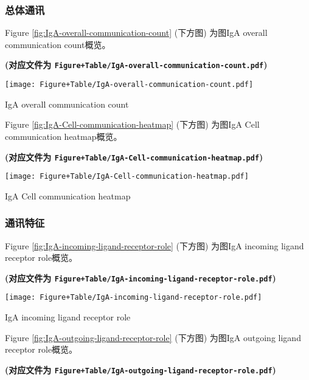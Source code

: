 \documentclass[
]{article}
\begin{document}
\hypertarget{ux603bux4f53ux901aux8baf}{%
\subsubsection{总体通讯}\label{ux603bux4f53ux901aux8baf}}

Figure \ref{fig:IgA-overall-communication-count} (下方图) 为图IgA overall communication count概览。

\textbf{(对应文件为 \texttt{Figure+Table/IgA-overall-communication-count.pdf})}

\def\@captype{figure}
\begin{center}
\texttt{[image: Figure+Table/IgA-overall-communication-count.pdf]}
\caption{IgA overall communication count}\label{fig:IgA-overall-communication-count}
\end{center}

Figure \ref{fig:IgA-Cell-communication-heatmap} (下方图) 为图IgA Cell communication heatmap概览。

\textbf{(对应文件为 \texttt{Figure+Table/IgA-Cell-communication-heatmap.pdf})}

\def\@captype{figure}
\begin{center}
\texttt{[image: Figure+Table/IgA-Cell-communication-heatmap.pdf]}
\caption{IgA Cell communication heatmap}\label{fig:IgA-Cell-communication-heatmap}
\end{center}

\hypertarget{ux901aux8bafux7279ux5f81}{%
\subsubsection{通讯特征}\label{ux901aux8bafux7279ux5f81}}

Figure \ref{fig:IgA-incoming-ligand-receptor-role} (下方图) 为图IgA incoming ligand receptor role概览。

\textbf{(对应文件为 \texttt{Figure+Table/IgA-incoming-ligand-receptor-role.pdf})}

\def\@captype{figure}
\begin{center}
\texttt{[image: Figure+Table/IgA-incoming-ligand-receptor-role.pdf]}
\caption{IgA incoming ligand receptor role}\label{fig:IgA-incoming-ligand-receptor-role}
\end{center}

Figure \ref{fig:IgA-outgoing-ligand-receptor-role} (下方图) 为图IgA outgoing ligand receptor role概览。

\textbf{(对应文件为 \texttt{Figure+Table/IgA-outgoing-ligand-receptor-role.pdf})}
\end{document}
